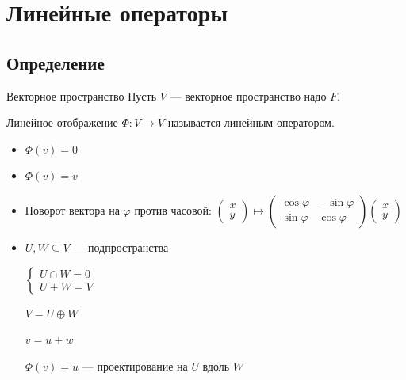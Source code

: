\section{Линейные операторы}

\subsection{Определение}

\begin{defn}{Векторное пространство}{}
    Пусть \( V \) --- векторное пространство надо \( F \).

    Линейное отображение \( \Phi : V \to V \) называется линейным оператором.
\end{defn}

\begin{example}{}{}
    \begin{itemize}
        \item
            \( \Phi(v) = 0 \)
        \item
            \( \Phi(v) = v \)
        \item
            Поворот вектора на \( \varphi \) против часовой:
            \(
                \displaystyle
                \begin{pmatrix}
                    x
                    \\
                    y
                \end{pmatrix}
                \mapsto
                \begin{pmatrix}
                    \cos \varphi & -\sin \varphi
                    \\
                    \sin \varphi & \cos \varphi
                \end{pmatrix}
                \begin{pmatrix}
                    x
                    \\
                    y
                \end{pmatrix}
            \)
        \item
            \( U, W \subseteq V \) --- подпространства

            \(
                \begin{cases}
                    U \cap W = 0
                    \\
                    U + W = V
                \end{cases}
            \)

            \( V = U \oplus W \)

            \( v = u + w \)

            \( \Phi(v) = u \) --- проектирование на \( U \) вдоль \( W \)
    \end{itemize}
\end{example}

